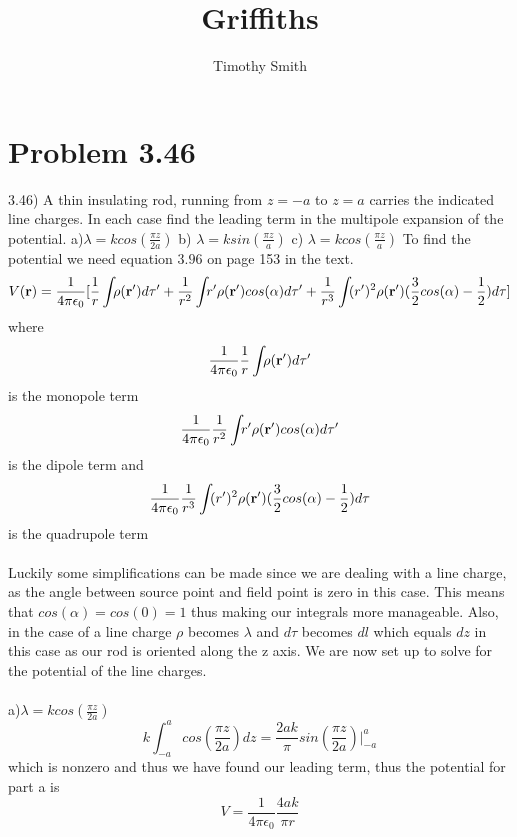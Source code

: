 \documentclass{article}
\begin{document}
\author{Timothy Smith}
\title{Griffiths}
\maketitle

\section*{Problem 3.46}
3.46) A thin insulating rod, running from $z=-a$ to $z=a$ carries the indicated line charges. In each case find the leading term in the multipole expansion of the potential. 
a)$ \lambda= kcos(\frac{\pi z}{2a})$ b) $ \lambda= ksin(\frac{\pi z}{a})$ c) $ \lambda= kcos(\frac{\pi z}{a})$
To find the potential we need equation $3.96 $ on page 153 in the text.
\begin{equation}
V(\vb{r})=\frac{1}{4\pi\epsilon_0}[\frac{1}{r}\int_{}{}\rho(\vb{r'})d\tau'+\frac{1}{r^2}\int_{}{}r'\rho(\vb{r'})cos(\alpha)d\tau'+\frac{1}{r^3}\int_{}{}(r')^2\rho(\vb{r'})(\frac{3}{2}cos(\alpha)-\frac{1}{2})d\tau]
\end{equation}
where 
$$\frac{1}{4\pi\epsilon_0}\frac{1}{r}\int_{}{}\rho(\vb{r'})d\tau'$$
is the monopole term
$$\frac{1}{4\pi\epsilon_0}\frac{1}{r^2}\int_{}{}r'\rho(\vb{r'})cos(\alpha)d\tau'$$
is the dipole term and
$$\frac{1}{4\pi\epsilon_0}\frac{1}{r^3}\int_{}{}(r')^2\rho(\vb{r'})(\frac{3}{2}cos(\alpha)-\frac{1}{2})d\tau$$ 
is the quadrupole term
\\
\\
Luckily some simplifications can be made since we are dealing with a line charge, as the angle between source point and field point is zero in this case. This means that $cos(\alpha)=cos(0)=1$ thus making  our integrals more manageable. Also, in the case of a line charge $\rho$ becomes $\lambda$ and $d\tau$ becomes $dl$ which equals $dz$ in this case as our rod is oriented along the z axis. We are now set up to solve for the potential of the line charges.
\\
\\
a)$ \lambda= kcos(\frac{\pi z}{2a})$
\begin{equation}
k\int_{-a}^{a}cos(\frac{\pi z}{2a})dz
=
\frac{2ak}{\pi}sin(\frac{\pi z}{2a}) \Big|_{-a}^a
\end{equation}
which is nonzero and thus we have found our leading term, thus the potential for part a is 
\begin{equation}
V=\frac{1}{4\pi\epsilon_0}\frac{4ak}{\pi r}
\end{equation}
\end{document}
